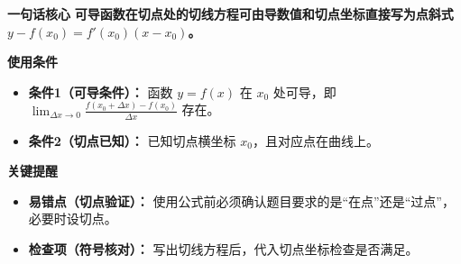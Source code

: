 \begin{summarybox}
	\textbf{\textcolor{CSummary}{一句话核心}}
	\textbf{可导函数在切点处的切线方程可由导数值和切点坐标直接写为点斜式 $y - f(x_0) = f'(x_0)(x - x_0)$。}

	\medskip
	\textbf{\textcolor{CSummary}{使用条件}}
	\begin{itemize}[leftmargin=*, itemsep=0.5em, topsep=0.4em]
		\item \textbf{条件1（可导条件）：} 函数 $y = f(x)$ 在 $x_0$ 处可导，即 $\displaystyle \lim_{\Delta x\to 0}\frac{f(x_0+\Delta x) - f(x_0)}{\Delta x}$ 存在。
		\item \textbf{条件2（切点已知）：} 已知切点横坐标 $x_0$，且对应点在曲线上。
	\end{itemize}

	\medskip
	\textbf{\textcolor{CSummary}{关键提醒}}
	\begin{itemize}[leftmargin=*, itemsep=0.5em, topsep=0.4em]
		\item \textbf{易错点（切点验证）：} 使用公式前必须确认题目要求的是“在点”还是“过点”，必要时设切点。
		\item \textbf{检查项（符号核对）：} 写出切线方程后，代入切点坐标检查是否满足。
	\end{itemize}

\end{summarybox}
